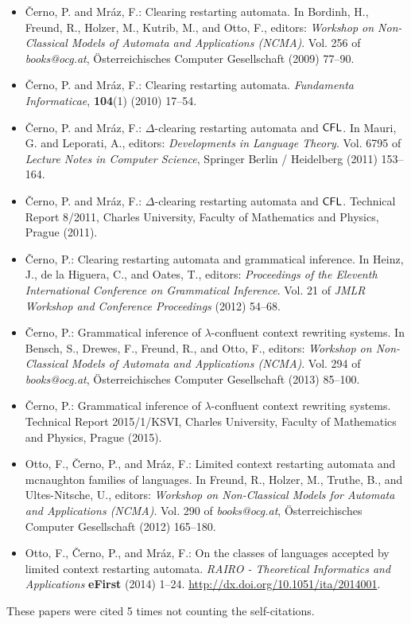 \begin{itemize}
\item {\v C}erno, P. and Mr{\'a}z, F.: Clearing restarting automata. In Bordinh, H., Freund, R., Holzer, M., Kutrib, M., and Otto, F., editors: \emph{Workshop on Non-Classical Models of Automata and Applications (NCMA)}. Vol. 256 of \emph{books@ocg.at}, {\"O}sterreichisches Computer Gesellschaft (2009) 77--90.
\item {\v C}erno, P. and Mr{\'a}z, F.: Clearing restarting automata. \emph{Fundamenta Informaticae}, {\bf 104}(1) (2010) 17--54.
\item {\v C}erno, P. and Mr{\'a}z, F.: $\Delta$-clearing restarting automata and $\textup{\sf CFL}$. In Mauri, G. and Leporati, A., editors: \emph{Developments in Language Theory}. Vol. 6795 of \emph{Lecture Notes in Computer Science}, Springer Berlin / Heidelberg (2011) 153--164.
\item {\v C}erno, P. and Mr{\'a}z, F.: $\Delta$-clearing restarting automata and $\textup{\sf CFL}$. Technical Report 8/2011, Charles University, Faculty of Mathematics and Physics, Prague (2011).
\item {\v C}erno, P.: Clearing restarting automata and grammatical inference. In Heinz, J., de la Higuera, C., and Oates, T., editors: \emph{Proceedings of the Eleventh International Conference on Grammatical Inference}. Vol. 21 of \emph{JMLR Workshop and Conference Proceedings} (2012) 54--68.
\item {\v C}erno, P.: Grammatical inference of $\lambda$-confluent context rewriting systems. In Bensch, S., Drewes, F., Freund, R., and Otto, F., editors: \emph{Workshop on Non-Classical Models of Automata and Applications (NCMA)}. Vol. 294 of \emph{books@ocg.at}, {\"O}sterreichisches Computer Gesellschaft (2013) 85--100.
\item {\v C}erno, P.: Grammatical inference of $\lambda$-confluent context rewriting systems. Technical Report 2015/1/KSVI, Charles University, Faculty of Mathematics and Physics, Prague (2015).
\item Otto, F., {\v C}erno, P., and Mr{\'a}z, F.: Limited context restarting automata and mcnaughton families of languages. In Freund, R., Holzer, M., Truthe, B., and Ultes-Nitsche, U., editors: \emph{Workshop on Non-Classical Models for Automata and Applications (NCMA)}. Vol. 290 of \emph{books@ocg.at}, {\"O}sterreichisches Computer Gesellschaft (2012) 165--180.
\item Otto, F., {\v C}erno, P., and Mr{\'a}z, F.: On the classes of languages accepted by limited context restarting automata. \emph{RAIRO - Theoretical Informatics and Applications} {\bf eFirst} (2014) 1--24. \url{http://dx.doi.org/10.1051/ita/2014001}.
\end{itemize}

These papers were cited 5 times not counting the self-citations.

